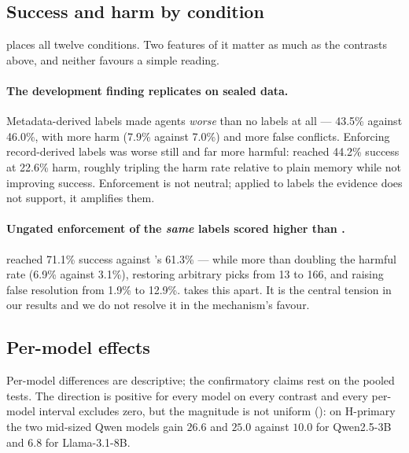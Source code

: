 

\subsection{Success and harm by condition}

 places all twelve conditions. Two features of it matter as much as the contrasts above, and
neither favours a simple reading.

\paragraph{The development finding replicates on sealed data.} Metadata-derived labels made agents \emph{worse}
than no labels at all ---  43.5\% against  46.0\%, with more harm (7.9\% against 7.0\%) and more
false conflicts. Enforcing record-derived labels was worse still and far more harmful:  reached 44.2\%
success at 22.6\% harm, roughly tripling the harm rate relative to plain memory while not improving success.
Enforcement is not neutral; applied to labels the evidence does not support, it amplifies them.

\paragraph{Ungated enforcement of the \emph{same} labels scored higher than .}  reached
71.1\% success against 's 61.3\% --- while more than doubling the harmful rate (6.9\% against 3.1\%),
restoring arbitrary picks from 13 to 166, and raising false resolution from 1.9\% to 12.9\%.
 takes this apart. It is the central tension in our results and we do not resolve it in the
mechanism's favour.



\subsection{Per-model effects}

Per-model differences are descriptive; the confirmatory claims rest on the pooled tests. The direction is positive
for every model on every contrast and every per-model interval excludes zero, but the magnitude is not uniform
(): on H-primary the two mid-sized Qwen models gain $26.6$ and $25.0$\pp{} against $10.0$\pp{}
for Qwen2.5-3B and $6.8$\pp{} for Llama-3.1-8B.

